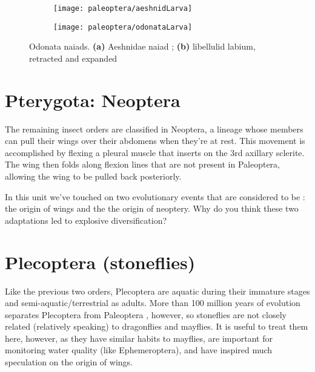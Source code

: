 \begin{figure}[ht!]
    \centering
    \begin{subfigure}[ht!]{0.45\textwidth}
        \texttt{[image: paleoptera/aeshnidLarva]}
        \caption{}
        \label{fig:OdonataLarva}
    \end{subfigure}
    \hfill
    \begin{subfigure}[ht!]{0.47\textwidth}
       \texttt{[image: paleoptera/odonataLarva]}
        \caption{}
        \label{fig:OdonataLarvaLabium}
    \end{subfigure}
    \caption{Odonata naiads. \textbf{(a)} Aeshnidae naiad \citep[][Fig. 59]{bhl128276}; \textbf{(b)} libellulid labium, retracted and expanded \citep[redrawn from][Fig. 1]{bhlpart204280odelarva}}\label{fig:odeLarvae}
\end{figure}

\FloatBarrier

\section*{Pterygota: Neoptera}
The remaining insect orders are classified in Neoptera, a lineage whose members can pull their wings over their abdomens when they're at rest. This movement is accomplished by flexing a pleural muscle that inserts on the 3rd axillary sclerite. The wing then folds along flexion lines that are not present in Paleoptera, allowing the wing to be pulled back posteriorly.\vspace{3mm}

\begin{theo}
{}In this unit we've touched on two evolutionary events that are considered to be : the origin of wings and the the origin of neoptery. Why do you think these two adaptations led to explosive diversification?
\end{theo}

\section{Plecoptera (stoneflies)}%
Like the previous two orders, Plecoptera are aquatic during their immature stages and semi-aquatic/terrestrial as adults. More than 100 million years of evolution separates Plecoptera from Paleoptera \citep{Misof763}, however, so stoneflies are not closely related (relatively speaking) to dragonflies and mayflies. It is useful to treat them here, however, as they have similar habits to mayflies, are important for monitoring water quality (like Ephemeroptera), and have inspired much speculation on the origin of wings.

